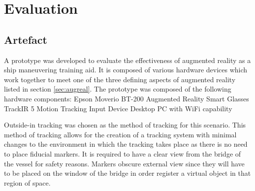 \chapter{Evaluation}
\section{Artefact}	
A prototype was developed to evaluate the effectiveness of augmented reality as a ship maneuvering training aid. It is composed of various hardware devices which work together to meet one of the three defining aspects of augmented reality listed in section \ref{sec:augreal}. The prototype was composed of the following hardware components:
Epson Moverio BT-200 Augmented Reality Smart Glasses
TrackIR 5 Motion Tracking Input Device
Desktop PC with WiFi capability 
 
Outside-in tracking was chosen as the method of tracking for this scenario. This method of tracking allows for the creation of a tracking system with minimal changes to the environment in which the tracking takes place as there is no need to place fiducial markers. It is required to have a clear view from the bridge of the vessel for safety reasons. Markers obscure external view since they will have to be placed on the window of the bridge in order register a virtual object in that region of space.

%
%
%

